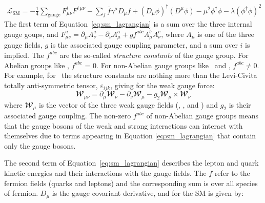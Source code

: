 \begin{align}
	\mathcal{L}_{\text{SM}} = -\frac{1}{4} \sum\limits_{\text{gauge}} \mathit{F}_{\mu \nu}^i \mathit{F}^{i\,\mu\nu}
	- \sum\limits_{f} \bar{f}\gamma^{\mu} \mathit{D}_{\mu} f 
	+  (\mathit{D}_{\mu} \phi)^{\dagger} (\mathit{D}^{\mu} \phi) - \mu^2 \phi^{\dagger}\phi - \lambda(\phi^{\dagger}\phi)^2
	\label{eq:sm_lagrangian}
\end{align}
\noindent
The first term of Equation~\ref{eq:sm_lagrangian} is a sum over the three internal gauge goups,  and $\mathit{F}^a_{\mu \nu} = \partial_{\mu} \mathit{A}_{\nu}^a - \partial_{\nu} \mathit{A}_{\mu}^a + g f^{abc} \mathit{A}_{\mu}^{b}\mathit{A}_{\nu}^{c}$, where $\mathit{A}_{\mu}$ is one of the
three gauge fields, $g$ is the associated gauge coupling parameter, and a sum over $i$ is implied. The $f^{abc}$ are the so-called
\textit{structure constants} of the gauge group. For Abelian groups like \Uone, $f^{abc}$ = 0.
For non-Abelian gauge groups like \SUtwo~and \SUthree, $f^{abc} \ne 0$. For example, for
\SUtwo~the structure constants are nothing more than the Levi-Civita totally anti-symmetric tensor, 
$\varepsilon_{ijk}$, giving for the weak gauge force:
\begin{equation}
	\mathbfcal{W}_{\mu \nu} = \partial_{\mu} \mathbfcal{W}_{\nu} - \partial_{\nu} \mathbfcal{W}_{\mu} - g_2 \mathbfcal{W}_{\mu} \times \mathbfcal{W}_{\nu}
\end{equation}
where $\mathbfcal{W}_{\mu}$ is the vector of the three weak gauge fields (\fieldWone, \fieldWtwo, and \fieldWthree) and $g_2$ is their associated gauge coupling. The non-zero $f^{abc}$ of non-Abelian gauge groups means that the gauge bosons of
the weak and strong interactions can interact with themselves due to terms appearing in Equation
\ref{eq:sm_lagrangian} that contain only the gauge bosons. %

The second term of Equation~\ref{eq:sm_lagrangian} describes the lepton and quark kinetic energies and their interactions with the gauge fields.
The $f$ refer to the fermion fields (quarks and leptons) and the corresponding sum is over all
species of fermion. $\mathit{D}_{\mu}$ is the gauge covariant derivative, and for the SM is
given by:

